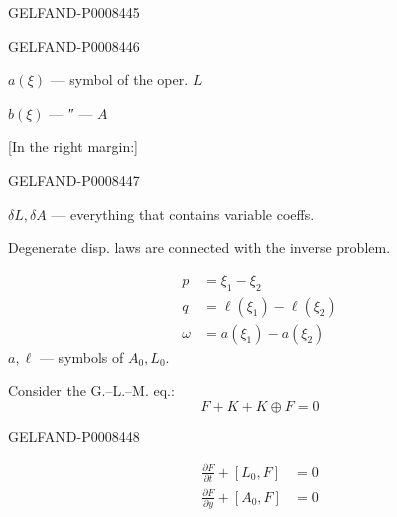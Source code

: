 \begin{GelfandAdjacentEvidence}{GELFAND-P000844}{5}

\end{GelfandAdjacentEvidence}
\begin{GelfandAdjacentEvidence}{GELFAND-P000844}{6}


\(a(\xi)\) — symbol of the oper. \(L\)

\(b(\xi)\) — ″ — \(A\)

[In the right margin:]
\end{GelfandAdjacentEvidence}
\begin{GelfandAdjacentEvidence}{GELFAND-P000844}{7}

\(\delta L,\delta A\) — everything that contains variable coeffs.

Degenerate disp. laws are connected with the inverse problem.

\[
\begin{aligned}
p&=\xi_1-\xi_2\\
q&=\ell(\xi_1)-\ell(\xi_2)\\
\omega&=a(\xi_1)-a(\xi_2)
\end{aligned}
\]
\(a,\ell\) — symbols of \(A_0,L_0\).

Consider the G.–L.–M. eq.:
\[
F+K+K\oplus F=0
\]
\end{GelfandAdjacentEvidence}
\begin{GelfandAdjacentEvidence}{GELFAND-P000844}{8}


\[
\begin{aligned}
\frac{\partial F}{\partial t}+[L_0,F]&=0\\
\frac{\partial F}{\partial y}+[A_0,F]&=0
\end{aligned}
\]
\end{GelfandAdjacentEvidence}

